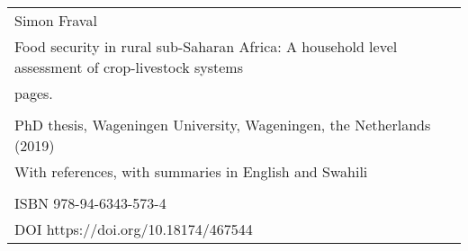 \newpage
\thispagestyle{empty}
\vspace*{\fill}
\begin{flushleft}
\begin{tabular}{l}
    Simon Fraval                                                 \\
    Food security in rural sub-Saharan Africa: A household level assessment of crop-livestock systems                 \\
    \pageref{LastPage} pages.                                    \\
                                                                 \\
    PhD thesis, Wageningen University, Wageningen, the Netherlands (2019)     \\
    With references, with summaries in English and Swahili                  \\
                                                                 \\
    ISBN 978-94-6343-573-4\\
    DOI https://doi.org/10.18174/467544                                            \\
\end{tabular}
\end{flushleft}
